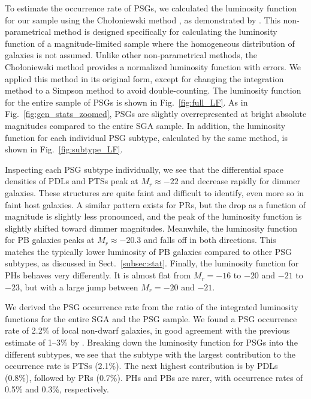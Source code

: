 \documentclass{aa}
\begin{document}
To estimate the occurrence rate of PSGs, we calculated the luminosity function for our sample using the Cho\l oniewski method \citep{1986MNRAS.223....1C}, as demonstrated by \citet{2022MNRAS.516.3692S}. This non-parametrical method is designed specifically for calculating the luminosity function of a magnitude-limited sample where the homogeneous distribution of galaxies is not assumed. Unlike other non-parametrical methods, the Cho\l oniewski method provides a normalized luminosity function with errors. We applied this method in its original form, except for changing the integration method to a Simpson method to avoid double-counting. The luminosity function for the entire sample of PSGs is shown in Fig.~\ref{fig:full_LF}. As in Fig.~\ref{fig:gen_stats_zoomed}, PSGs are slightly overrepresented at bright absolute magnitudes compared to the entire SGA sample. In addition, the luminosity function for each individual PSG subtype, calculated by the same method, is shown in Fig.~\ref{fig:subtype_LF}. 

Inspecting each PSG subtype individually, we see that the differential space densities of PDLs and PTSs peak at $M_r\approx-22$ and decrease rapidly for dimmer galaxies. These structures are quite faint and difficult to identify, even more so in faint host galaxies. A similar pattern exists for PRs, but the drop as a function of magnitude is slightly less pronounced, and the peak of the luminosity function is slightly shifted toward dimmer magnitudes. Meanwhile, the luminosity function for PB galaxies peaks at $M_r\approx-20.3$ and falls off in both directions. This matches the typically lower luminosity of PB galaxies compared to other PSG subtypes, as discussed in Sect.~\ref{subsec:stat}. Finally, the luminosity function for PHs behaves very differently. It is almost flat from $M_r=-16$ to $-20$ and $-21$ to $-23$, but with a large jump between $M_r=-20$ and $-21$.

We derived the PSG occurrence rate from the ratio of the integrated luminosity functions for the entire SGA and the PSG sample. We found a PSG occurrence rate of 2.2\% of local non-dwarf galaxies, in good agreement with the previous estimate of 1--3\% by \citet{2024A&A...681L..15M}. Breaking down the luminosity function for PSGs into the different subtypes, we see that the subtype with the largest contribution to the occurrence rate is PTSs (2.1\%). The next highest contribution is by PDLs (0.8\%), followed by PRs (0.7\%). PHs and PBs are rarer, with occurrence rates of 0.5\% and 0.3\%, respectively.
\end{document}
